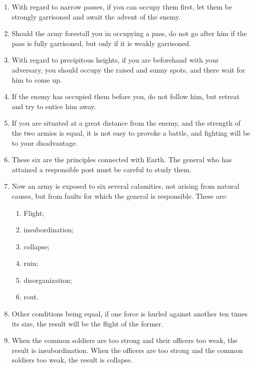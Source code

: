 \begin{enumerate}
  \item With regard to narrow passes, if you can occupy them first,
    let them be strongly garrisoned and await the advent of the enemy.

  \item Should the army forestall you in occupying a pass, do not go
    after him if the pass is fully garrisoned, but only if it is
    weakly garrisoned.

  \item With regard to precipitous heights, if you are beforehand with
    your adversary, you should occupy the raised and sunny spots, and
    there wait for him to come up.

  \item If the enemy has occupied them before you, do not follow him,
    but retreat and try to entice him away.

  \item If you are situated at a great distance from the enemy, and
    the strength of the two armies is equal, it is not easy to provoke
    a battle, and fighting will be to your disadvantage.

  \item These six are the principles connected with Earth. The general
    who has attained a responsible post must be careful to study them.

  \item Now an army is exposed to six several calamities, not arising
    from natural causes, but from faults for which the general is
    responsible. These are:
    \begin{enumerate}
    \item Flight; \item insubordination; \item collapse; \item
      ruin; \item disorganization; \item rout.
    \end{enumerate}


  \item Other conditions being equal, if one force is hurled against
    another ten times its size, the result will be the flight of the
    former.

  \item When the common soldiers are too strong and their officers too
    weak, the result is insubordination. When the officers are too
    strong and the common soldiers too weak, the result is collapse.


\end{enumerate}
